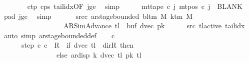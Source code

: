 \begin{isabellebody}
\ \ \ \ \ \ \isamarkupfalse%
\ c{}{\isacharunderscore}{\kern0pt}tp\ c{}{\isacharunderscore}{\kern0pt}ps\ tail{\isacharunderscore}{\kern0pt}idx{\isacharbrackleft}{\kern0pt}OF\ jge{\isacharbrackright}{\kern0pt}\ \isamarkupfalse%
\ simp\isanewline
\ \ \ \ \isamarkupfalse%
\ {\isachardoublequoteopen}mt{\isacharunderscore}{\kern0pt}tape\ c{}\ j\ {\isacharparenleft}{\kern0pt}mt{\isacharunderscore}{\kern0pt}pos\ c{}\ j{\isacharparenright}{\kern0pt}\ {\isacharequal}{\kern0pt}\ BLANK{}{\isachardoublequoteclose}\ \isamarkupfalse%
\ pad{}\ jge\ \isamarkupfalse%
\ simp\isanewline
\ \ \isamarkupfalse%
\isanewline
\ \ \isamarkupfalse%
\ src{\isacharunderscore}{\kern0pt}c{}{\isacharcolon}{\kern0pt}\ {\isachardoublequoteopen}ar{\isacharunderscore}{\kern0pt}stage{\isacharunderscore}{\kern0pt}bounded\ {\isacharparenleft}{\kern0pt}bl{\isacharunderscore}{\kern0pt}tm\ M{\isacharparenright}{\kern0pt}\ {\isacharparenleft}{\kern0pt}k{\isacharunderscore}{\kern0pt}tm\ M{\isacharparenright}{\kern0pt}\isanewline
\ \ \ \ \ \ \ \ \ \ \ \ \ \ \ \ \ \ {\isacharparenleft}{\kern0pt}AR{\isacharunderscore}{\kern0pt}SimAdvance{\isacharcomma}{\kern0pt}\ {\isacharquery}{\kern0pt}tl{\isacharcomma}{\kern0pt}\ {}{\isacharcomma}{\kern0pt}\ buf{}{\isacharcomma}{\kern0pt}\ dvec{\isacharcomma}{\kern0pt}\ {\isacharquery}{\kern0pt}pk{\isacharparenright}{\kern0pt}{\isachardoublequoteclose}\isanewline
\ \ \ \ \isamarkupfalse%
\ src{}\ tl{\isacharunderscore}{\kern0pt}active\ tail{\isacharunderscore}{\kern0pt}idx\ \isamarkupfalse%
\ {\isacharparenleft}{\kern0pt}auto\ simp{\isacharcolon}{\kern0pt}\ ar{\isacharunderscore}{\kern0pt}stage{\isacharunderscore}{\kern0pt}bounded{\isacharunderscore}{\kern0pt}def{\isacharparenright}{\kern0pt}\isanewline
\ \ \isamarkupfalse%
\ c{}\ \isanewline
\ \ \ \ \ \ step{\isacharcolon}{\kern0pt}\ {\isachardoublequoteopen}{\isacharparenleft}{\kern0pt}c{}{\isacharcomma}{\kern0pt}\ c{}{\isacharparenright}{\kern0pt}\ {\isasymin}\ R{\isacharprime}{\kern0pt}\ {\isacharcircum}{\kern0pt}{\isacharcircum}{\kern0pt}\ {\isacharparenleft}{\kern0pt}if\ dvec\ {\isacharquery}{\kern0pt}tl\ {\isacharequal}{\kern0pt}\ dir{\isachardot}{\kern0pt}R\ then\ {}\isanewline
\ \ \ \ \ \ \ \ \ \ \ \ \ \ \ \ else\ ar{\isacharunderscore}{\kern0pt}disp\ {\isacharquery}{\kern0pt}k\ {\isacharparenleft}{\kern0pt}dvec\ {\isacharquery}{\kern0pt}tl{\isacharparenright}{\kern0pt}\ {\isacharparenleft}{\kern0pt}{\isacharquery}{\kern0pt}pk\ {\isacharquery}{\kern0pt}tl{\isacharparenright}{\kern0pt}{\isacharparenright}{\kern0pt}{\isachardoublequoteclose}\isanewline

\end{isabellebody}
